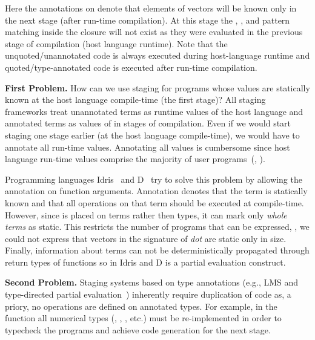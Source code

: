Here the  annotations on  denote that elements of vectors will be known
 only in the next stage (after run-time compilation). At this stage the ,
 , and pattern matching inside the closure will not exist
 as they were evaluated in the previous stage of compilation (host language runtime). Note that
 the unquoted/unannotated code is always executed during host-language runtime
 and quoted/type-annotated code is executed after run-time compilation.

{\bf First Problem.} How can we use staging for programs whose values are statically
 known at the host language compile-time (the first stage)? All staging frameworks
 treat unannotated terms as runtime values of the host language and annotated terms as
 values of in stages of compilation. Even if we would start staging one stage earlier (at the host language compile-time),
 we would have to annotate all run-time values. Annotating all values is cumbersome
 since host language run-time values comprise the majority of user programs~(\cf, ).


Programming languages Idris~\cite{brady2010scrapping} and D~\cite{dlang} try to solve this problem by allowing
 the  annotation on function arguments. Annotation  denotes
 that the term is statically known and that all operations on that term should
 be executed at compile-time. However, since  is placed on terms rather
 then types, it can mark only \emph{whole terms} as static. This restricts the number
 of programs that can be expressed, \eg, we could not express that vectors in the
 signature of \emph{dot} are static only in size. Finally, information about 
 terms can not be deterministically propagated through return types of functions so 
 in Idris and D is a partial evaluation construct.

{\bf Second Problem.} Staging systems based on type annotations (e.g., LMS and type-directed
partial evaluation~\cite{danvy1999type}) inherently require duplication of code as,
a priory, no operations are defined on  annotated types. For example,
in the  function all numerical types (\eg, , , etc.)
must be re-implemented in order to typecheck the programs and achieve code generation
for the next stage.

